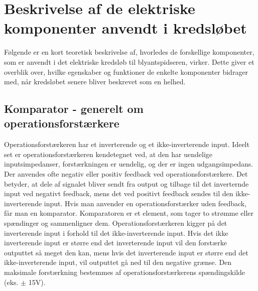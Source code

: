 
\section{Beskrivelse af de elektriske komponenter anvendt i kredsløbet}

Følgende er en kort teoretisk beskrivelse af, hvorledes de forskellige komponenter, som er anvendt i det elektriske kredsløb til blyantspidseren, virker. Dette giver et overblik over, hvilke egenskaber og funktioner de enkelte komponenter bidrager med, når kredsløbet senere bliver beskrevet som en helhed. 

  
\subsection{Komparator - generelt om operationsforstærkere}

Operationsforstærkeren har et inverterende og et ikke-inverterende input. 
Ideelt set er operationsforstærkeren kendetegnet ved, at den har uendelige inputsimpedanser, forstærkningen er uendelig, og der er ingen udgangsimpedans. Der anvendes ofte negativ eller positiv feedback ved operationsforstærkere. Det betyder, at dele af signalet bliver sendt fra output og tilbage til det inverternde input ved negativt feedback, mens det ved positivt feedback sendes til den ikke-inverterende input.  Hvis man anvender en operationsforstærker uden feedback, får man en komparator. Komparatoren er et element, som tager to strømme eller spændinger og sammenligner dem. Operationsforstærkeren kigger på det inverterende input i forhold til det ikke-inverterende input. Hvis det ikke inverterende input er større end det inverterende input vil den forstærke outputtet så meget den kan, mens hvis det inverterende input er større end det ikke-inverterende input, vil outputtet gå ned til den negative grænse. Den maksimale forstærkning bestemmes af operationsforstærkerens spændingskilde (eks. $\pm$ 15V).

